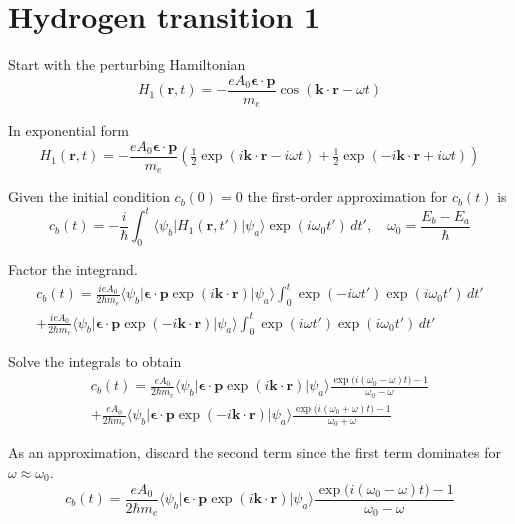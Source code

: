 

\section*{Hydrogen transition 1}

Start with the perturbing Hamiltonian
\begin{equation*}
H_1(\mathbf r,t)=-\frac{eA_0\boldsymbol{\epsilon}\cdot\mathbf p}{m_e}
\cos(\mathbf k\cdot\mathbf r-\omega t)
\end{equation*}

In exponential form
\begin{equation*}
H_1(\mathbf r,t)=-\frac{eA_0\boldsymbol{\epsilon}\cdot\mathbf p}{m_e}
\left(\tfrac{1}{2}\exp(i\mathbf k\cdot\mathbf r-i\omega t)
+\tfrac{1}{2}\exp(-i\mathbf k\cdot\mathbf r+i\omega t)\right)
\end{equation*}

Given the initial condition $c_b(0)=0$ the first-order approximation for $c_b(t)$ is
\begin{equation*}
c_b(t)=-\frac{i}{\hbar}\int_0^t
\langle\psi_b|H_1(\mathbf r,t')|\psi_a\rangle\exp(i\omega_0t')\,dt',\quad
\omega_0=\frac{E_b-E_a}{\hbar}
\end{equation*}

Factor the integrand.
\begin{multline*}
c_b(t)
=\frac{ieA_0}{2\hbar m_e}
\langle\psi_b|\boldsymbol{\epsilon}\cdot\mathbf p\exp(i\mathbf k\cdot\mathbf r)|\psi_a\rangle
\int_0^t\exp(-i\omega t')\exp(i\omega_0t')\,dt'
\\
+\frac{ieA_0}{2\hbar m_e}
\langle\psi_b|\boldsymbol{\epsilon}\cdot\mathbf p\exp(-i\mathbf k\cdot\mathbf r)|\psi_a\rangle
\int_0^t\exp(i\omega t')\exp(i\omega_0t')\,dt'
\end{multline*}

Solve the integrals to obtain
\begin{multline*}
c_b(t)=\frac{eA_0}{2\hbar m_e}
\langle\psi_b|\boldsymbol{\epsilon}\cdot\mathbf p\exp(i\mathbf k\cdot\mathbf r)|\psi_a\rangle
\frac{\exp\bigl(i(\omega_0-\omega)t\bigr)-1}{\omega_0-\omega}
\\
+\frac{eA_0}{2\hbar m_e}
\langle\psi_b|\boldsymbol{\epsilon}\cdot\mathbf p\exp(-i\mathbf k\cdot\mathbf r)|\psi_a\rangle
\frac{\exp\bigl(i(\omega_0+\omega)t\bigr)-1}{\omega_0+\omega}
\tag{1}
\end{multline*}

As an approximation, discard the second term since the first term
dominates for $\omega\approx\omega_0$.
\begin{equation*}
c_b(t)=\frac{eA_0}{2\hbar m_e}
\langle\psi_b|\boldsymbol{\epsilon}\cdot\mathbf p\exp(i\mathbf k\cdot\mathbf r)|\psi_a\rangle
\frac{\exp\bigl(i(\omega_0-\omega)t\bigr)-1}{\omega_0-\omega}
\end{equation*}

